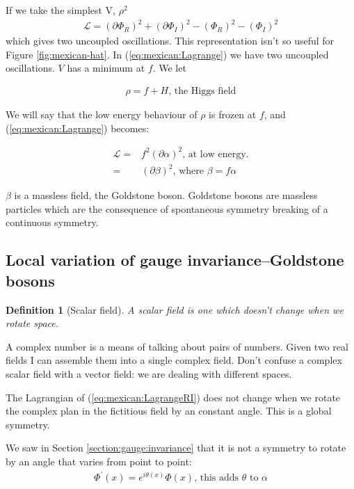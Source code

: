 \documentclass[]{article}
\newtheorem{defn}[thm]{Definition}
\begin{document}
If we take the simplest V, $\rho^2$
\begin{align*}
	\mathcal{L} = (\partial \Phi_R)^2 +  (\partial \Phi_I)^2 -(\Phi_R)^2  -(\Phi_I)^2
\end{align*}
which gives two uncoupled oscillations. This representation isn't so useful for Figure \ref{fig:mexican-hat}. In (\ref{eq:mexican:Lagrange}) we have two uncoupled oscillations. $V$ has a minimum at $f$. We let

\begin{align*}
	\rho = f + H \text{, the Higgs field}
\end{align*}

We will say that the low energy behaviour of $\rho$ is frozen at $f$, and (\ref{eq:mexican:Lagrange}) becomes:

\begin{align*}
	\mathcal{L} =& f^2(\partial \alpha)^2 \text{, at low energy.}\\
	=& (\partial \beta)^2 \text{, where $\beta = f \alpha$}
\end{align*}

$\beta$ is a massless field, the Goldstone boson. Goldstone bosons are massless particles which are the consequence of spontaneous symmetry breaking of a continuous symmetry.

\subsection{Local variation of gauge invariance--Goldstone bosons}

\begin{defn}[Scalar field]
	A scalar field is one which doesn't change when we rotate space.
\end{defn}

A complex number is a means of talking about pairs of numbers. Given two real fields I can assemble them into a single complex field. Don't confuse a complex scalar field with a vector field: we are dealing with different spaces.

The Lagrangian of (\ref{eq:mexican:LagrangeRI})  does not change when we rotate the complex plan in the fictitious field by an constant angle. This is a global symmetry.

We saw in Section \ref{section:gauge:invariance} that it is not a  symmetry to rotate by an angle that varies from point to point:
\begin{align*}
	\Phi^\prime (x) = e^{i\theta(x)} \Phi(x) \text{, this adds $\theta$ to $\alpha$}
\end{align*}
\end{document}
